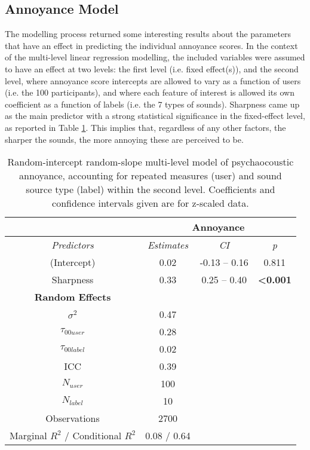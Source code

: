 \subsection{Annoyance Model}
The modelling process returned some interesting results about the parameters that have an effect in predicting the individual annoyance scores. In the context of the multi-level linear regression modelling, the included variables were assumed to have an effect at two levels: the first level (i.e. fixed effect(s)), and the second level, where annoyance score intercepts are allowed to vary as a function of users (i.e. the 100 participants), and where each feature of interest is allowed its own coefficient as a function of labels (i.e. the 7 types of sounds). Sharpness came up as the main predictor with a strong statistical significance in the fixed-effect level, as reported in Table \ref{tab:annoyance-model}. This implies that, regardless of any other factors, the sharper the sounds, the more annoying these are perceived to be.

\begin{table}
\centering
\caption{Random-intercept random-slope multi-level model of psychaocoustic annoyance, accounting for repeated measures (user) and sound source type (label) within the second level. Coefficients and confidence intervals given are for z-scaled data.}
\label{tab:annoyance-model}
\begin{tabular}{cccc} 
\toprule
 & \multicolumn{3}{c}{\textbf{Annoyance }} \\ 
\hline
\textit{Predictors} & \textit{Estimates} & \textit{CI} & \textit{p} \\ 
\hline
(Intercept) & 0.02 & -0.13 -- 0.16 & 0.811 \\
Sharpness & 0.33 & 0.25 -- 0.40 & \textbf{\textless{}0.001} \\ 
\hline
\textbf{Random Effects} &  &  &  \\ 
\hline
$\sigma^2$ & 0.47 &  &  \\
$\tau_{00user}$ & 0.28 &  &  \\
$\tau_{00label}$ & 0.02 &  &  \\
ICC & 0.39 &  &  \\
$N_{user}$ & 100 &  &  \\
$N_{label}$ & 10 &  &  \\ 
\hline
Observations & 2700 &  &  \\
Marginal $R^2$ / Conditional $R^2$ & 0.08 / 0.64 &  &  \\
\bottomrule
\end{tabular}
\end{table}

